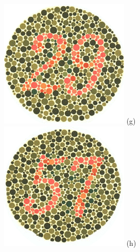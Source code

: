 \documentclass[	12pt, Times, openright, twoside, a4paper, english, brazil]{abntex2}
\begin{document}
\begin{apendicesenv}
\begin{figure}[!htb]
\centering
{\includegraphics[width=\linewidth]{ishihara-transformacao/plate4.jpg}}
(g)
\endminipage\hfill
{}
\centering
{\includegraphics[width=\linewidth]{ishihara-transformacao/plate5.jpg}}
(h)
\endminipage\hfill



\end{figure}
\end{apendicesenv}
\end{document}
